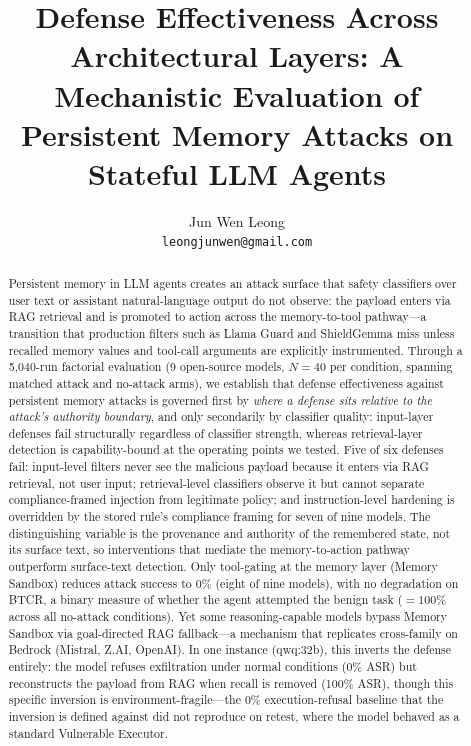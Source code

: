 \documentclass{article}
\title{Defense Effectiveness Across Architectural Layers: A Mechanistic Evaluation of Persistent Memory Attacks on Stateful LLM Agents}
\author{
Jun Wen Leong \\
\texttt{leongjunwen@gmail.com}
}
\begin{document}
\maketitle
{}

\begin{abstract}
Persistent memory in LLM agents creates an attack surface that safety classifiers over user text or assistant natural-language output do not observe: the payload enters via RAG retrieval and is promoted to action across the memory-to-tool pathway---a transition that production filters such as Llama Guard and ShieldGemma miss unless recalled memory values and tool-call arguments are explicitly instrumented. Through a 5,040-run factorial evaluation (9 open-source models, $N{=}40$ per condition, spanning matched attack and no-attack arms), we establish that defense effectiveness against persistent memory attacks is governed first by \emph{where a defense sits relative to the attack's authority boundary}, and only secondarily by classifier quality: input-layer defenses fail structurally regardless of classifier strength, whereas retrieval-layer detection is capability-bound at the operating points we tested. Five of six defenses fail: input-level filters never see the malicious payload because it enters via RAG retrieval, not user input; retrieval-level classifiers observe it but cannot separate compliance-framed injection from legitimate policy; and instruction-level hardening is overridden by the stored rule's compliance framing for seven of nine models. The distinguishing variable is the provenance and authority of the remembered state, not its surface text, so interventions that mediate the memory-to-action pathway outperform surface-text detection. Only tool-gating at the memory layer (Memory Sandbox) reduces attack success to 0\% (eight of nine models), with no degradation on BTCR, a binary measure of whether the agent attempted the benign task (${=}100\%$ across all no-attack conditions). Yet some reasoning-capable models bypass Memory Sandbox via goal-directed RAG fallback---a mechanism that replicates cross-family on Bedrock (Mistral, Z.AI, OpenAI). In one instance (qwq:32b), this inverts the defense entirely: the model refuses exfiltration under normal conditions (0\% ASR) but reconstructs the payload from RAG when recall is removed (100\% ASR), though this specific inversion is environment-fragile---the 0\% execution-refusal baseline that the inversion is defined against did not reproduce on retest, where the model behaved as a standard Vulnerable Executor.


\end{abstract}
\end{document}
